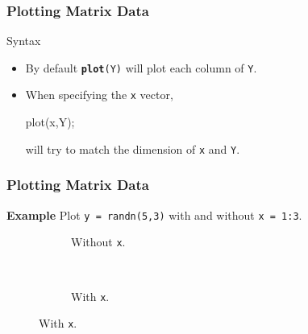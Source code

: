 \documentclass{beamer}  %
\newcommand{\tttbf}[1]{\texttt{\textbf{#1}}} %
\begin{document}
\begin{frame}[fragile]
\frametitle{Plotting Matrix Data}

\begin{block}{Syntax}
\begin{itemize}[<+->]
    \item By default \tttbf{plot}\texttt{(Y)} will plot each column of \texttt{Y}.
    \item When specifying the \texttt{x} vector,
          \begin{matlabcodebeamer}[frame=none]
          plot(x,Y);
          \end{matlabcodebeamer}
          will try to match the dimension of \texttt{x} and \texttt{Y}.
\end{itemize}
\end{block}

\end{frame}
\begin{frame}[fragile]
\frametitle{Plotting Matrix Data}
\textbf{Example} 
Plot \texttt{y = randn(5,3)} with and without \texttt{x = 1:3}.\pause
\setcounter{subfigure}{0}
\begin{figure}
        \begin{subfigure}[b]{0.3\textwidth}
                \centering
                \caption{Without \texttt{x}.}
        \end{subfigure}%
        ~\pause
        \begin{subfigure}[b]{0.3\textwidth}
                \centering
                \caption{With \texttt{x}.}
        \end{subfigure}
\end{figure}

\end{frame}
\end{document}
